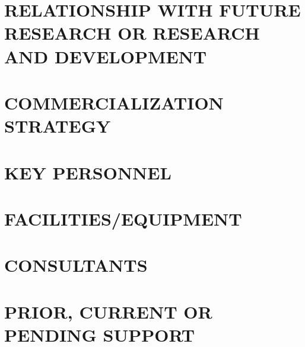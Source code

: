 \documentclass[letterpaper,11pt,onecolumn]{article}
\begin{document}
\section{RELATIONSHIP WITH FUTURE RESEARCH OR RESEARCH AND DEVELOPMENT}

\section{COMMERCIALIZATION STRATEGY}

\section{KEY PERSONNEL}

\section{FACILITIES/EQUIPMENT}

\section{CONSULTANTS}

\section{PRIOR, CURRENT OR PENDING SUPPORT}
\end{document}
